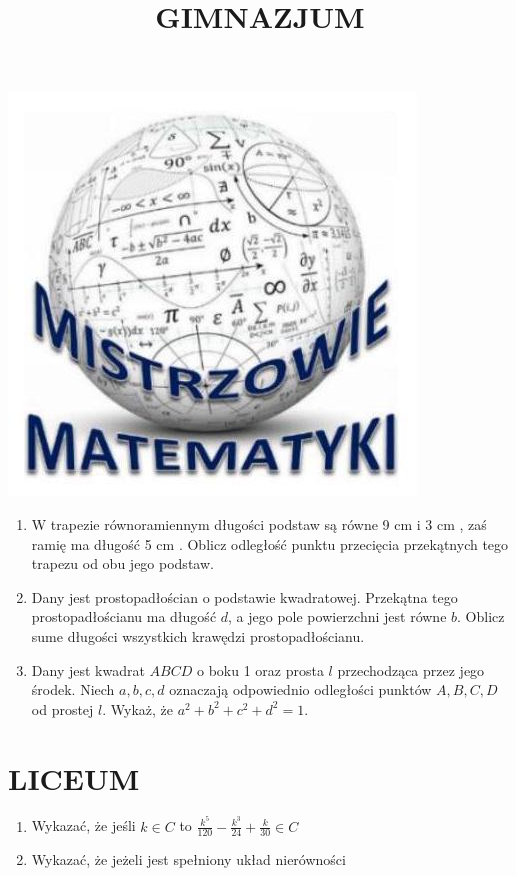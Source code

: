 \documentclass[10pt]{article}
\title{GIMNAZJUM }
\author{}
\date{}
\begin{document}
\maketitle
\begin{center}
\includegraphics[max width=\textwidth]{2024_11_21_a95391cca29a10598dd2g-1}
\end{center}

\begin{enumerate}
  \item W trapezie równoramiennym długości podstaw są równe 9 cm i 3 cm , zaś ramię ma długość 5 cm . Oblicz odległość punktu przecięcia przekątnych tego trapezu od obu jego podstaw.
  \item Dany jest prostopadłościan o podstawie kwadratowej. Przekątna tego prostopadłościanu ma długość \(d\), a jego pole powierzchni jest równe \(b\). Oblicz sume długości wszystkich krawędzi prostopadłościanu.
  \item Dany jest kwadrat \(A B C D\) o boku 1 oraz prosta \(l\) przechodząca przez jego środek. Niech \(a, b, c, d\) oznaczają odpowiednio odległości punktów \(A, B, C, D\) od prostej \(l\). Wykaż, że \(a^{2}+b^{2}+c^{2}+d^{2}=1\).
\end{enumerate}

\section*{LICEUM}
\begin{enumerate}
  \item Wykazać, że jeśli \(k \in C\) to \(\frac{k^{5}}{120}-\frac{k^{3}}{24}+\frac{k}{30} \in C\)
  \item Wykazać, że jeżeli jest spełniony układ nierówności
\end{enumerate}
\end{document}
